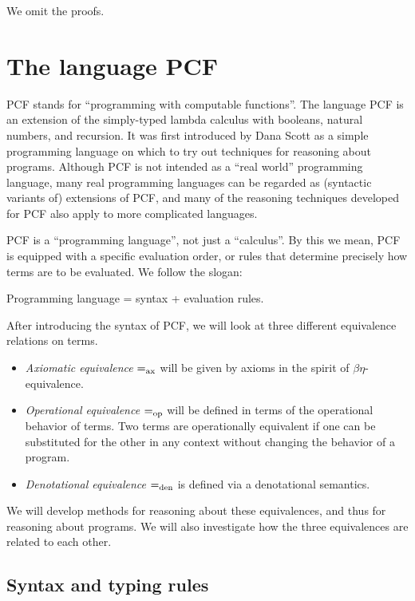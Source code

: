 \documentclass{article}
\begin{document}
We omit the proofs.


\section{The language PCF}

PCF stands for ``programming with computable functions''. The language
PCF is an extension of the simply-typed lambda calculus with booleans,
natural numbers, and recursion. It was first introduced by Dana Scott
as a simple programming language on which to try out techniques for
reasoning about programs. Although PCF is not intended as a ``real
world'' programming language, many real programming languages can be
regarded as (syntactic variants of) extensions of PCF, and many of the
reasoning techniques developed for PCF also apply to more complicated
languages.

PCF is a ``programming language'', not just a ``calculus''. By this we
mean, PCF is equipped with a specific evaluation order, or rules that
determine precisely how terms are to be evaluated. We follow the
slogan:
\begin{center}
  Programming language = syntax + evaluation rules.
\end{center}

After introducing the syntax of PCF, we will look at three different
equivalence relations on terms.
\begin{itemize}
\item {\em Axiomatic equivalence} $=_{\rm ax}$ will be given by axioms in
  the spirit of $\beta\eta$-equivalence.
\item {\em Operational equivalence} $=_{\rm op}$ will be defined in terms
  of the operational behavior of terms. Two terms are operationally
  equivalent if one can be substituted for the other in any context
  without changing the behavior of a program.
\item {\em Denotational equivalence} $=_{\rm den}$ is defined via a
  denotational semantics.
\end{itemize}

We will develop methods for reasoning about these equivalences, and
thus for reasoning about programs. We will also investigate how the
three equivalences are related to each other.

\subsection{Syntax and typing rules}
\end{document}
